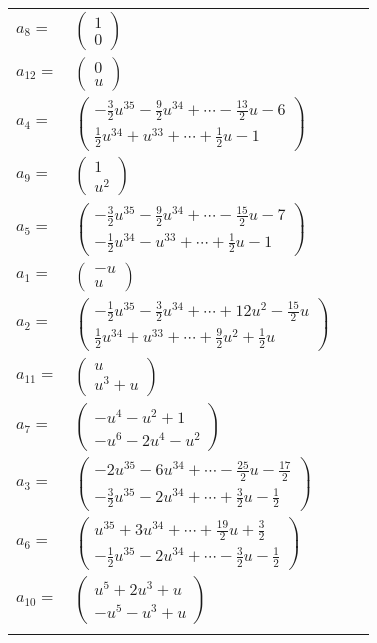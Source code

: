 \documentclass[1p]{elsarticle_modified}
\theoremstyle{definition}
\begin{document}
\begin{tabular}{m{7pt} m{180pt} m{7pt} m{180pt} }
\flushright $a_{8}=$&$\begin{pmatrix}1\\0\end{pmatrix}$ \\
\flushright $a_{12}=$&$\begin{pmatrix}0\\u\end{pmatrix}$ \\
\flushright $a_{4}=$&$\begin{pmatrix}-\frac{3}{2} u^{35}-\frac{9}{2} u^{34}+\cdots-\frac{13}{2} u-6\\\frac{1}{2} u^{34}+u^{33}+\cdots+\frac{1}{2} u-1\end{pmatrix}$ \\
\flushright $a_{9}=$&$\begin{pmatrix}1\\u^2\end{pmatrix}$ \\
\flushright $a_{5}=$&$\begin{pmatrix}-\frac{3}{2} u^{35}-\frac{9}{2} u^{34}+\cdots-\frac{15}{2} u-7\\-\frac{1}{2} u^{34}- u^{33}+\cdots+\frac{1}{2} u-1\end{pmatrix}$ \\
\flushright $a_{1}=$&$\begin{pmatrix}- u\\u\end{pmatrix}$ \\
\flushright $a_{2}=$&$\begin{pmatrix}-\frac{1}{2} u^{35}-\frac{3}{2} u^{34}+\cdots+12 u^2-\frac{15}{2} u\\\frac{1}{2} u^{34}+u^{33}+\cdots+\frac{9}{2} u^2+\frac{1}{2} u\end{pmatrix}$ \\
\flushright $a_{11}=$&$\begin{pmatrix}u\\u^3+u\end{pmatrix}$ \\
\flushright $a_{7}=$&$\begin{pmatrix}- u^4- u^2+1\\- u^6-2 u^4- u^2\end{pmatrix}$ \\
\flushright $a_{3}=$&$\begin{pmatrix}-2 u^{35}-6 u^{34}+\cdots-\frac{25}{2} u-\frac{17}{2}\\-\frac{3}{2} u^{35}-2 u^{34}+\cdots+\frac{3}{2} u-\frac{1}{2}\end{pmatrix}$ \\
\flushright $a_{6}=$&$\begin{pmatrix}u^{35}+3 u^{34}+\cdots+\frac{19}{2} u+\frac{3}{2}\\-\frac{1}{2} u^{35}-2 u^{34}+\cdots-\frac{3}{2} u-\frac{1}{2}\end{pmatrix}$ \\
\flushright $a_{10}=$&$\begin{pmatrix}u^5+2 u^3+u\\- u^5- u^3+u\end{pmatrix}$\\&\end{tabular}
\end{document}
